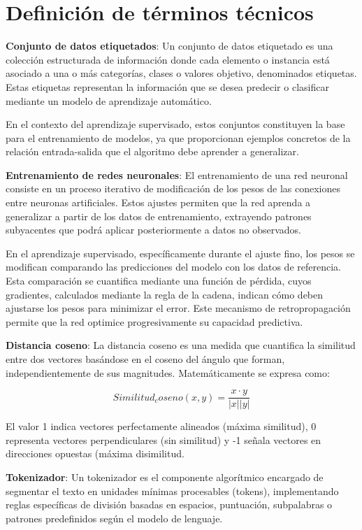 \section{Definición de términos técnicos}

\textbf{Conjunto de datos etiquetados}\label{anexo:datos_et}: Un conjunto de datos etiquetado es una colección estructurada de información donde cada elemento o instancia está asociado a una o más categorías, clases o valores objetivo, denominados etiquetas. Estas etiquetas representan la información que se desea predecir o clasificar mediante un modelo de aprendizaje automático.

En el contexto del aprendizaje supervisado, estos conjuntos constituyen la base para el entrenamiento de modelos, ya que proporcionan ejemplos concretos de la relación entrada-salida que el algoritmo debe aprender a generalizar.

\textbf{Entrenamiento de redes neuronales}\label{anexo:entrenamiento}: El entrenamiento de una red neuronal consiste en un proceso iterativo de modificación de los pesos de las conexiones entre neuronas artificiales. Estos ajustes permiten que la red aprenda a generalizar a partir de los datos de entrenamiento, extrayendo patrones subyacentes que podrá aplicar posteriormente a datos no observados.

En el aprendizaje supervisado, específicamente durante el ajuste fino, los pesos se modifican comparando las predicciones del modelo con los datos de referencia. Esta comparación se cuantifica mediante una función de pérdida, cuyos gradientes, calculados mediante la regla de la cadena, indican cómo deben ajustarse los pesos para minimizar el error. Este mecanismo de retropropagación permite que la red optimice progresivamente su capacidad predictiva.

\textbf{Distancia coseno}\label{anexo:dis_cos}: La distancia coseno es una medida que cuantifica la similitud entre dos vectores basándose en el coseno del ángulo que forman, independientemente de sus magnitudes. Matemáticamente se expresa como: 

\[Similitud_coseno(x,y) = \frac{x \cdot y}{|x||y|}\]

El valor 1 indica vectores perfectamente alineados (máxima similitud), 0 representa vectores perpendiculares (sin similitud) y -1 señala vectores en direcciones opuestas (máxima disimilitud.

\textbf{Tokenizador}\label{anexo:tokenizer}: Un tokenizador es el componente algorítmico encargado de segmentar el texto en unidades mínimas procesables (tokens), implementando reglas específicas de división basadas en espacios, puntuación, subpalabras o patrones predefinidos según el modelo de lenguaje.


